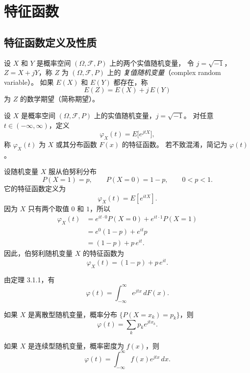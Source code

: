 \chapter{特征函数}
\section{特征函数定义及性质}
\begin{definition}[复随机变量 $Z=X+jY$ 的期望是 $E(Z)=E(X)+jE(Y)$]
设 $X$ 和 $Y$ 是概率空间 $(\Omega,\mathcal F,P)$ 上的两个实值随机变量，
令 $j=\sqrt{-1}$，$Z=X+jY$，称 $Z$ 为 $(\Omega,\mathcal F,P)$ 上的
\emph{复值随机变量}（complex random variable）。
如果 $E(X)$ 和 $E(Y)$ 都存在，称
\[
E(Z) = E(X) + j\,E(Y)
\]
为 $Z$ 的数学期望（简称期望）。
\end{definition}
\begin{definition}
设 $X$ 是概率空间 $(\Omega,\mathcal F,P)$ 上的实值随机变量，$j=\sqrt{-1}$。
对任意 $t\in(-\infty,\infty)$，定义
\[
\varphi_X(t)=E\bigl[e^{jtX}\bigr],
\]
称 $\varphi_X(t)$ 为 $X$ 或其分布函数 $F(x)$ 的特征函数。
若不致混淆，简记为 $\varphi(t)$。

\end{definition}
\begin{example}[伯努利分布的特征函数]
设随机变量 $X$ 服从伯努利分布
\[
P(X=1)=p,\qquad P(X=0)=1-p,\qquad 0<p<1.
\]
它的特征函数定义为
\[
\varphi_X(t)=E\!\left[e^{itX}\right].
\]
因为 $X$ 只有两个取值 $0$ 和 $1$，所以
\[
\begin{aligned}
\varphi_X(t)
&= e^{it\cdot 0}P(X=0)+e^{it\cdot 1}P(X=1)\\
&= e^{0}(1-p)+e^{it}p\\
&= (1-p)+p\,e^{it}.
\end{aligned}
\]
因此，伯努利随机变量 $X$ 的特征函数为
\[
\boxed{\varphi_X(t)=(1-p)+p\,e^{it}.}
\]
\end{example}
\begin{note}
    由定理 3.1.1，有
\[
\varphi(t)=\int_{-\infty}^{\infty} e^{jtx}\, dF(x). \tag{4.1.1}
\]

如果 $X$ 是离散型随机变量，概率分布 $\{P(X=x_k)=p_k\}$，则
\[
\varphi(t)=\sum_k p_k e^{jt x_k}. \tag{4.1.2}
\]

如果 $X$ 是连续型随机变量，概率密度为 $f(x)$，则
\[
\varphi(t)=\int_{-\infty}^{\infty} f(x)e^{jtx}\,dx. \tag{4.1.3}
\]
\end{note}
